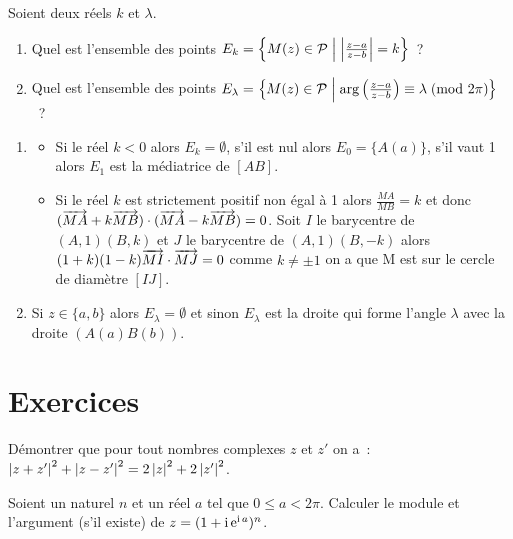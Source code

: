 Soient deux réels \(k\) et \(\lambda\).
\begin{enumerate}
    \item Quel est l'ensemble des points \(E_k = \left\{M(z) \in 
        \mathcal{P}\mathrel{}\middle|\mathrel{}\left\lvert\frac{z-a}{z-b}\right\rvert = k\right\}\)~?
    \item Quel est l'ensemble des points \(E_\lambda = \left\{M(z) \in 
        \mathcal{P}\mathrel{}\middle|\mathrel{}\arg \left(\frac{z-a}{z-b} \right) \equiv \lambda\!\pmod {2\pi}\right\}\)~?
\end{enumerate}
\begin{enumerate}
    \item 
        \begin{itemize}
            \item Si le réel \(k<0\) alors \(E_k = \emptyset\), s'il est nul 
                alors \(E_0 = \{A(a)\}\), s'il vaut 1 alors \(E_1\) est la 
                médiatrice de \([AB]\).
            \item Si le réel \(k\) est strictement positif non égal à 1 alors 
                \(\frac{MA}{MB} = k\) et donc \((\overrightarrow{MA} + k\overrightarrow{MB}) \cdot 
                (\overrightarrow{MA}-k\overrightarrow{MB}) = 0\). Soit \(I\) le barycentre de 
                \((A,1)(B,k)\) et \(J\) le barycentre de \((A,1)(B,-k)\) alors 
                \((1 + k)(1-k) \overrightarrow{MI} \cdot \overrightarrow{MJ}  = 0\) comme \(k \neq 
                \pm 1\) on a que M est sur le cercle de diamètre \([IJ]\).
        \end{itemize}
    \item Si \(z \in \{a,b\}\) alors \(E_\lambda = \emptyset\) et sinon 
        \(E_\lambda\) est la droite qui forme l'angle \(\lambda\) avec la droite 
        \((A(a)B(b))\).
\end{enumerate}

\section{Exercices}

\begin{exercice}
    Démontrer que pour tout nombres complexes \(z\) et \(z'\) on a~:\(\left\lvert z + 
    z'\right\rvert^2 + \left\lvert z-z'\right\rvert^2 = 2\left\lvert z\right\rvert^2 + 2\left\lvert z'\right\rvert^2\).
\end{exercice}

\begin{exercice}
    Soient un naturel \(n\) et un réel \(a\) tel que \(0 \leqslant a < 2\pi\).  
    Calculer le module et l'argument (s'il existe) de \(z = (1 + \operatorname{i}\operatorname{e}^{\operatorname{i} 
    a})^n\).
\end{exercice}

